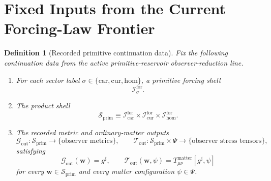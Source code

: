 \documentclass[11pt]{article}
\newcommand{\CompletedMetric}{g^{\sharp}}
\newcommand{\MatterSpace}{\Psi}
\newcommand{\Car}{\mathrm{car}}
\newcommand{\Cur}{\mathrm{cur}}
\newcommand{\Hom}{\mathrm{hom}}
\newcommand{\ForSpace}[1]{\mathcal I_{#1}^{\mathrm{for}}}
\newcommand{\PrimShell}{\mathcal S_{\mathrm{prim}}}
\newcommand{\MetricOut}{\mathscr G_{\mathrm{out}}}
\newcommand{\MatterOut}{\mathscr T_{\mathrm{out}}}
\newtheorem{definition}{Definition}
\begin{document}
\section{Fixed Inputs from the Current Forcing-Law Frontier}

\begin{definition}[Recorded primitive continuation data]
\label{def:fixed}
Fix the following continuation data from the active primitive-reservoir observer-reduction line.
\begin{enumerate}
    \item For each sector label \(\sigma\in\{\Car,\Cur,\Hom\}\), a primitive forcing shell
    \[
    \ForSpace{\sigma}.
    \]
    \item The product shell
    \[
    \PrimShell
    \equiv
    \ForSpace{\Car}\times \ForSpace{\Cur}\times \ForSpace{\Hom}.
    \]
    \item The recorded metric and ordinary-matter outputs
    \[
    \MetricOut:\PrimShell\to\{\text{observer metrics}\},
    \qquad
    \MatterOut:\PrimShell\times\MatterSpace\to\{\text{observer stress tensors}\},
    \]
    satisfying
    \begin{equation}
    \MetricOut(\mathbf w)=\CompletedMetric,
    \qquad
    \MatterOut(\mathbf w,\psi)
    =
    T_{\mu\nu}^{\mathrm{matter}}[\CompletedMetric,\psi]
    \label{eq:fixedoutputs}
    \end{equation}
    for every \(\mathbf w\in\PrimShell\) and every matter configuration \(\psi\in\MatterSpace\).
\end{enumerate}
\end{definition}
\end{document}
